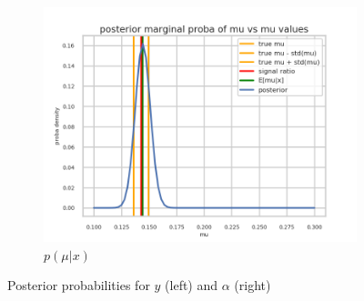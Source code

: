 \begin{figure}[htb]
  \begin{subfigure}[t]{0.49\linewidth}
    \includegraphics[width=\linewidth]{s3d2/marginal_mu.png}
    \caption{$p(\mu|x)$}
    \label{fig:marginal_mu}
  \end{subfigure}
  \caption{Posterior probabilities for $y$ (left) and $\alpha$ (right)}
  \label{fig:marginals}
\end{figure}






